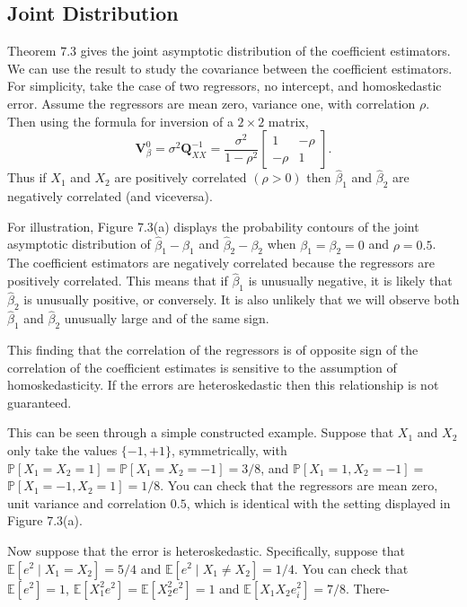 \documentclass[10pt]{article}
\begin{document}
\subsection{Joint Distribution}
Theorem $7.3$ gives the joint asymptotic distribution of the coefficient estimators. We can use the result to study the covariance between the coefficient estimators. For simplicity, take the case of two regressors, no intercept, and homoskedastic error. Assume the regressors are mean zero, variance one, with correlation $\rho$. Then using the formula for inversion of a $2 \times 2$ matrix,
$$
\boldsymbol{V}_{\beta}^{0}=\sigma^{2} \boldsymbol{Q}_{X X}^{-1}=\frac{\sigma^{2}}{1-\rho^{2}}\left[\begin{array}{cc}
1 & -\rho \\
-\rho & 1
\end{array}\right] .
$$
Thus if $X_{1}$ and $X_{2}$ are positively correlated $(\rho>0)$ then $\widehat{\beta}_{1}$ and $\widehat{\beta}_{2}$ are negatively correlated (and viceversa).

For illustration, Figure 7.3(a) displays the probability contours of the joint asymptotic distribution of $\widehat{\beta}_{1}-\beta_{1}$ and $\widehat{\beta}_{2}-\beta_{2}$ when $\beta_{1}=\beta_{2}=0$ and $\rho=0.5$. The coefficient estimators are negatively correlated because the regressors are positively correlated. This means that if $\widehat{\beta}_{1}$ is unusually negative, it is likely that $\widehat{\beta}_{2}$ is unusually positive, or conversely. It is also unlikely that we will observe both $\widehat{\beta}_{1}$ and $\widehat{\beta}_{2}$ unusually large and of the same sign.

This finding that the correlation of the regressors is of opposite sign of the correlation of the coefficient estimates is sensitive to the assumption of homoskedasticity. If the errors are heteroskedastic then this relationship is not guaranteed.

This can be seen through a simple constructed example. Suppose that $X_{1}$ and $X_{2}$ only take the values $\{-1,+1\}$, symmetrically, with $\mathbb{P}\left[X_{1}=X_{2}=1\right]=\mathbb{P}\left[X_{1}=X_{2}=-1\right]=3 / 8$, and $\mathbb{P}\left[X_{1}=1, X_{2}=-1\right]=$ $\mathbb{P}\left[X_{1}=-1, X_{2}=1\right]=1 / 8$. You can check that the regressors are mean zero, unit variance and correlation $0.5$, which is identical with the setting displayed in Figure 7.3(a).

Now suppose that the error is heteroskedastic. Specifically, suppose that $\mathbb{E}\left[e^{2} \mid X_{1}=X_{2}\right]=5 / 4$ and $\mathbb{E}\left[e^{2} \mid X_{1} \neq X_{2}\right]=1 / 4$. You can check that $\mathbb{E}\left[e^{2}\right]=1$, $\mathbb{E}\left[X_{1}^{2} e^{2}\right]=\mathbb{E}\left[X_{2}^{2} e^{2}\right]=1$ and $\mathbb{E}\left[X_{1} X_{2} e_{i}^{2}\right]=7 / 8$. There-
\end{document}

